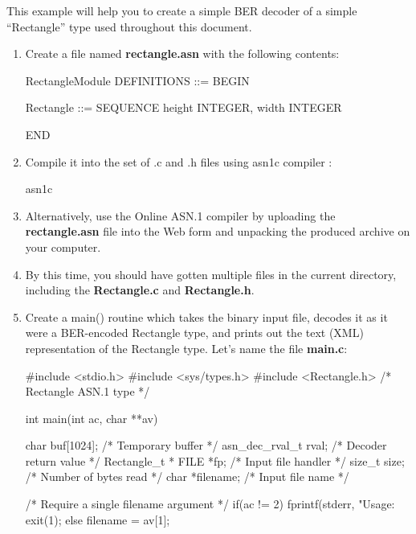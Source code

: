 \documentclass[english,oneside,12pt]{book}
\begin{document}
This example will help you to create a simple BER decoder of a simple
``Rectangle'' type used throughout this document.
\begin{enumerate}
\item Create a file named \textbf{rectangle.asn} with the following contents:

\begin{asn}
RectangleModule DEFINITIONS ::= BEGIN

Rectangle ::= SEQUENCE {
    height  INTEGER,
    width   INTEGER
}

END
\end{asn}
\item Compile it into the set of .c and .h files using asn1c compiler \cite{ASN1C}:

\begin{bash}
asn1c %
\end{bash}
\item Alternatively, use the Online ASN.1 compiler \cite{AONL} by uploading
the \textbf{rectangle.asn} file into the Web form and unpacking the
produced archive on your computer.
\item By this time, you should have gotten multiple files in the current
directory, including the \textbf{Rectangle.c} and \textbf{Rectangle.h}.
\item Create a main() routine which takes the binary input file, decodes
it as it were a BER-encoded Rectangle type, and prints out the text
(XML) representation of the Rectangle type. Let's name the file \textbf{main.c}:

\begin{codesample}[basicstyle=\scriptsize\listingfont]
#include <stdio.h>
#include <sys/types.h>
#include <Rectangle.h>   /* Rectangle ASN.1 type  */

int main(int ac, char **av) {
    char buf[1024];      /* Temporary buffer      */
    asn_dec_rval_t rval; /* Decoder return value  */
    Rectangle_t *%
    FILE *fp;            /* Input file handler    */
    size_t size;         /* Number of bytes read  */
    char *filename;      /* Input file name */

    /* Require a single filename argument */
    if(ac != 2) {
        fprintf(stderr, "Usage: %
        exit(1);
    } else {
        filename = av[1];
    }

}
\end{codesample}
\end{enumerate}
\end{document}
